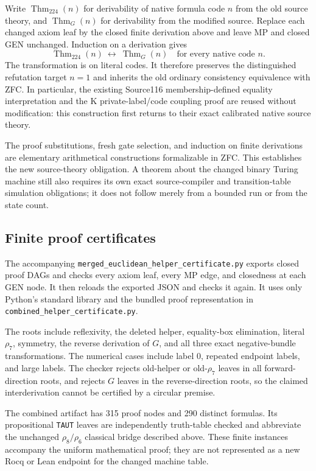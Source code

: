Write $\operatorname{Thm}_{224}(n)$ for derivability of native formula
code $n$ from the old source theory, and
$\operatorname{Thm}_{G}(n)$ for derivability from the modified source.
Replace each changed axiom leaf by the closed finite derivation above and
leave MP and closed GEN unchanged.  Induction on a derivation gives
\[
 \boxed{\qquad
 \operatorname{Thm}_{224}(n)
   \ \longleftrightarrow\ \operatorname{Thm}_{G}(n)
 \quad\text{for every native code }n.
 \qquad}
\]
The transformation is on literal codes.  It therefore preserves the
distinguished refutation target $n=1$ and inherits the old ordinary
consistency equivalence with ZFC.  In particular, the existing Source116
membership-defined equality interpretation and the K private-label/code
coupling proof are reused without modification: this construction first
returns to their exact calibrated native source theory.

The proof substitutions, fresh gate selection, and induction on finite
derivations are elementary arithmetical constructions formalizable in
ZFC.  This establishes the new source-theory obligation.  A theorem about
the changed binary Turing machine still also requires its own exact
source-compiler and transition-table simulation obligations; it does not
follow merely from a bounded run or from the state count.

\subsection{Finite proof certificates}

The accompanying
\texttt{merged\_euclidean\_helper\_certificate.py} exports closed proof
DAGs and checks every axiom leaf, every MP edge, and closedness at each GEN
node.  It then reloads the exported JSON and checks it again.  It uses
only Python's standard library and the bundled proof representation in
\texttt{combined\_helper\_certificate.py}.

The roots include reflexivity, the deleted helper, equality-box
elimination, literal $\rho_7$, symmetry, the reverse derivation of $G$,
and all three exact negative-bundle transformations.  The numerical cases
include label 0, repeated endpoint labels, and large labels.  The checker
rejects old-helper or old-$\rho_7$ leaves in all forward-direction roots,
and rejects $G$ leaves in the reverse-direction roots, so the claimed
interderivation cannot be certified by a circular premise.

The combined artifact has 315 proof nodes and 290 distinct formulas.  Its
propositional \texttt{TAUT} leaves are independently truth-table checked
and abbreviate the unchanged $\rho_8/\rho_6$ classical bridge described
above.  These finite instances accompany the uniform mathematical proof;
they are not represented as a new Rocq or Lean endpoint for the changed
machine table.
